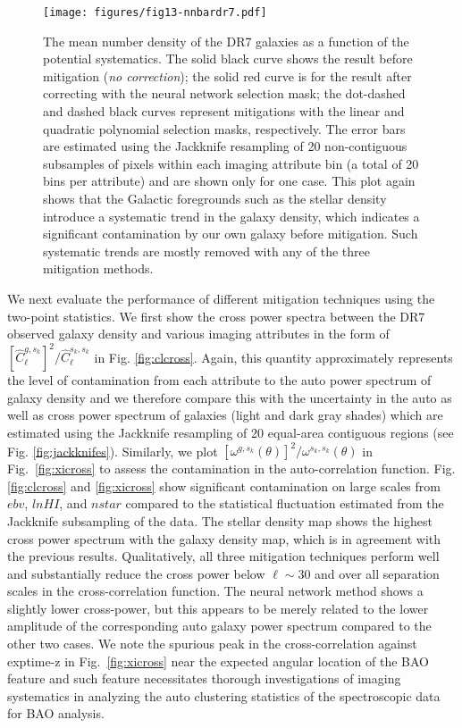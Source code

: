 \begin{figure*}
\centering
\texttt{[image: figures/fig13-nnbardr7.pdf]}
\caption{The mean number density of the DR7 galaxies as a function of the potential systematics. The solid black curve shows the result before mitigation (\textit{no correction}); the solid red curve is for the result after correcting with the neural network selection mask; the dot-dashed and dashed black curves represent mitigations with the linear and quadratic polynomial selection masks, respectively. The error bars are estimated using the Jackknife resampling of 20 non-contiguous subsamples of pixels within each imaging attribute bin (a total of 20 bins per attribute) and are shown only for one case. This plot again shows that the Galactic foregrounds such as the stellar density introduce a systematic trend in the galaxy density, which indicates a significant contamination by our own galaxy before mitigation. Such systematic trends are mostly removed with any of the three mitigation methods. \label{fig:nnbar}}
\end{figure*}


We next evaluate the performance of different mitigation techniques using the two-point statistics. We first show the cross power spectra between the DR7 observed galaxy density and various imaging attributes in the form of  $[\hat{C}^{g,s_k}_{\ell}]^2/\hat{C}^{s_k,s_k}_{\ell}$ in Fig. \ref{fig:clcross}. Again, this quantity approximately represents the level of contamination from each attribute to the auto power spectrum of galaxy density and we therefore compare this with the uncertainty in the auto as well as cross power spectrum of galaxies (light and dark gray shades) which are estimated using the Jackknife resampling of 20 equal-area contiguous regions (see Fig. \ref{fig:jackknifes}). Similarly, we plot $[\omega^{g,s_k}(\theta)]^2/\omega^{s_k,s_k}(\theta)$ in Fig.~\ref{fig:xicross} to assess the contamination in the auto-correlation function. Fig. \ref{fig:clcross} and \ref{fig:xicross} show significant contamination on large scales from $ebv$, $lnHI$, and $nstar$ compared to the statistical fluctuation estimated from the Jackknife subsampling of the data. The stellar density map shows the highest cross power spectrum with the galaxy density map, which is in agreement with the previous results. Qualitatively, all three mitigation techniques perform well and substantially reduce the cross power below $\ell \sim 30$ and over all separation scales in the cross-correlation function. The neural network method shows a slightly lower cross-power, but this appears to be merely related to the lower amplitude of the corresponding auto galaxy power spectrum compared to the other two cases. We note the spurious peak in the cross-correlation against exptime-z in Fig.~\ref{fig:xicross} near the expected angular location of the BAO feature and such feature necessitates thorough investigations of imaging systematics in analyzing the auto clustering statistics of the spectroscopic data for BAO analysis.\\

